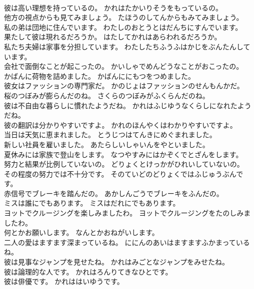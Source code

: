 \documentclass[8pt]{extreport}
\begin{document}
\begin{CJK}{UTF8}{min}
\\	彼は高い理想を持っているの。	かれはたかいりそうをもっているの。 
\\	他方の視点からも見てみましょう。	たほうのしてんからもみてみましょう。 
\\	私の弟は団地に住んでいます。	わたしのおとうとはだんちにすんでいます。 
\\	果たして彼は現れるだろうか。	はたしてかれはあらわれるだろうか。 
\\	私たち夫婦は家事を分担しています。	わたしたちふうふはかじをぶんたんしています。 
\\	会社で面倒なことが起こったの。	かいしゃでめんどうなことがおこったの。 
\\	かばんに荷物を詰めました。	かばんににもつをつめました。 
\\	彼女はファッションの専門家だ。	かのじょはファッションのせんもんかだ。 
\\	桜のつぼみが膨らんだのね。	さくらのつぼみがふくらんだのね。 
\\	彼は不自由な暮らしに慣れたようだね。	かれはふじゆうなくらしになれたようだね。 
\\	彼の翻訳は分かりやすいですよ。	かれのほんやくはわかりやすいですよ。 
\\	当日は天気に恵まれました。	とうじつはてんきにめぐまれました。 
\\	新しい社員を雇いました。	あたらしいしゃいんをやといました。 
\\	夏休みには家族で登山をします。	なつやすみにはかぞくでとざんをします。 
\\	努力と結果が比例していないの。	どりょくとけっかがひれいしていないの。 
\\	その程度の努力では不十分です。	そのていどのどりょくではふじゅうぶんです。 
\\	赤信号でブレーキを踏んだの。	あかしんごうでブレーキをふんだの。 
\\	ミスは誰にでもあります。	ミスはだれにでもあります。 
\\	ヨットでクルージングを楽しみましたわ。	ヨットでクルージングをたのしみましたわ。 
\\	何とかお願いします。	なんとかおねがいします。 
\\	二人の愛はますます深まっているね。	ににんのあいはますますふかまっているね。 
\\	彼は見事なジャンプを見せたね。	かれはみごとなジャンプをみせたね。 
\\	彼は論理的な人です。	かれはろんりてきなひとです。 
\\	彼は俳優です。	かれははいゆうです。 

\end{CJK}
\end{document}
